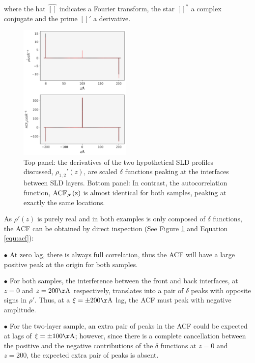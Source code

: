 \documentclass[
 reprint,
 superscriptaddress,
 amsmath,amssymb,
 aps,
]{revtex4-1}
\newcommand{\acf}{\rm{ACF}}
\newcommand{\angstrom}{\rm{\AA}}
\begin{document}
\noindent where the hat $\widehat{[]}$ indicates a Fourier transform, the star $[]^*$ a complex conjugate
and the prime $[]'$ a derivative. 

\begin{figure}
    \includegraphics[width=0.49\textwidth]{phase_problem_ACF.pdf}
    \caption{Top panel: the derivatives of the two hypothetical SLD profiles discussed, $\rho_{1,2}'(z)$, are
    scaled $\delta$ functions peaking at the interfaces between SLD layers. Bottom panel: In contrast,
    the autocorrelation function, $\acf_{\rho'}(z)$ is almost identical for both samples,
    peaking at exactly the same locations.}
    \label{fig:phase_problem_acf}
\end{figure}


As $\rho'(z)$ is purely real and in both examples is only composed of 
$\delta$ functions, the ACF can be obtained by direct inspection
(See Figure \ref{fig:phase_problem_acf} and Equation \ref{equ:acf}): 

$\bullet$ At zero lag, there is always full correlation, thus the ACF will have 
a large positive peak at the origin for both samples.

$\bullet$ For both samples, the interference between the front and back interfaces, at $z = 0$ and
$z = 200 \angstrom$ respectively, translates into a pair of $\delta$ peaks
with opposite signs in $\rho'$. Thus, at a 
$\xi = \pm 200 \angstrom$ lag, the ACF must peak with negative amplitude.


$\bullet$ For the two-layer sample, an extra pair of peaks in the ACF could be expected
at lags of $\xi = \pm 100 \angstrom$; however, since there is a complete cancellation between
the positive and the negative contributions of the $\delta$ functions at $z = 0$ and $z = 200$,
the expected extra pair of peaks is absent.
\end{document}
